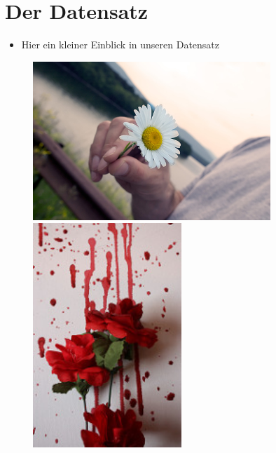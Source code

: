 \documentclass[t]{beamer}
\begin{document}
\section{Der Datensatz}
\begin{frame}
    \begin{itemize}
        \item Hier ein kleiner Einblick in unseren Datensatz
    \end{itemize}
    \begin{figure}
        \centering
        \begin{minipage}{0.4\textwidth}
            \centering
            \includegraphics[width=0.8\textwidth]{./teach-plots/dandelion.jpg} %
        \end{minipage}\hfill
        \begin{minipage}{0.4\textwidth}
            \centering
            \includegraphics[width=0.5\textwidth]{./teach-plots/rose.jpg} %

\end{minipage}
\end{figure}
\end{frame}
\end{document}
